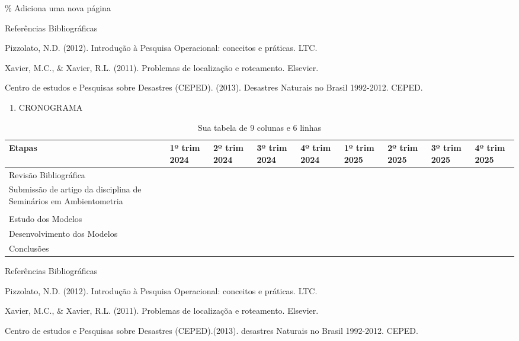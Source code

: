 \documentclass[
]{article}
\providecommand{\tightlist}{%
  \setlength{\itemsep}{0pt}\setlength{\parskip}{0pt}}
\begin{document}
\newpage

\% Adiciona uma nova página

Referências Bibliográficas

Pizzolato, N.D. (2012). Introdução à Pesquisa Operacional: conceitos e
práticas. LTC.

Xavier, M.C., \& Xavier, R.L. (2011). Problemas de localização e
roteamento. Elsevier.

Centro de estudos e Pesquisas sobre Desastres (CEPED). (2013). Desastres
Naturais no Brasil 1992-2012. CEPED.

\begin{enumerate}
\def\labelenumi{\arabic{enumi}.}
\setcounter{enumi}{5}
\tightlist
\item
  CRONOGRAMA
\end{enumerate}

\begin{table}[ht]
\centering
\begin{tabular}{|p{3cm}|p{1.5cm}|p{1.5cm}|p{1.5cm}|p{1.5cm}|p{1.5cm}|p{1.5cm}|p{1.5cm}|p{1.5cm}|}
\hline
Etapas & 1º trim 2024 & 2º trim 2024 & 3º trim 2024 & 4º trim 2024 & 1º trim 2025 & 2º trim 2025 & 3º trim 2025 & 4º trim 2025 \\ \hline
Revisão Bibliográfica   &    &    &    &    &    &    &    &    \\ \hline
Submissão de artigo da
disciplina de Seminários
em Ambientometria   &    &    &    &    &    &    &    &    \\ \hline
&    &    &    &    &    &    &    &    \\ \hline
Estudo dos Modelos   &    &    &    &    &    &    &    &    \\ \hline
Desenvolvimento dos Modelos
&    &    &    &    &    &    &    &    \\ \hline
Conclusões   &    &    &    &    &    &    &    &    \\ \hline
\end{tabular}
\caption{Sua tabela de 9 colunas e 6 linhas}
\end{table}

Referências Bibliográficas

Pizzolato, N.D. (2012). Introdução à Pesquisa Operacional: conceitos e
práticas. LTC.

Xavier, M.C., \& Xavier, R.L. (2011). Problemas de localizaçõa e
roteamento. Elsevier.

Centro de estudos e Pesquisas sobre Desastres (CEPED).(2013). desastres
Naturais no Brasil 1992-2012. CEPED.
\end{document}

